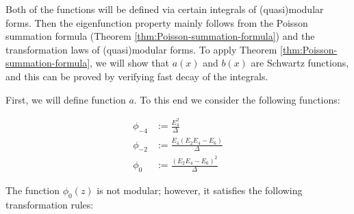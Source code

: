 Both of the functions will be defined via certain integrals of (quasi)modular forms.
Then the eigenfunction property mainly follows from the Poisson summation formula (Theorem \ref{thm:Poisson-summation-formula}) and the transformation laws of (quasi)modular forms.
To apply Theorem \ref{thm:Poisson-summation-formula}, we will show that $a(x)$ and $b(x)$ are Schwartz functions, and this can be proved by verifying fast decay of the integrals.



First, we will define function $a$. To this end we consider the following functions:
\begin{definition}\label{def:phi4-phi2-phi0}
\begin{align}
    \phi_{-4} &:= \frac{E_4^2}{\Delta} \label{eqn: def phi4} \\
    \phi_{-2} &:= \frac{E_4(E_2 E_4 - E_6)}{\Delta} \label{eqn: def phi2} \\
    \phi_{0} &:= \frac{(E_2 E_4 - E_6)^2}{\Delta} \label{eqn: def phi0}
\end{align}
\end{definition}


The function $\phi_0(z)$ is not modular; however, it satisfies the following transformation rules:

